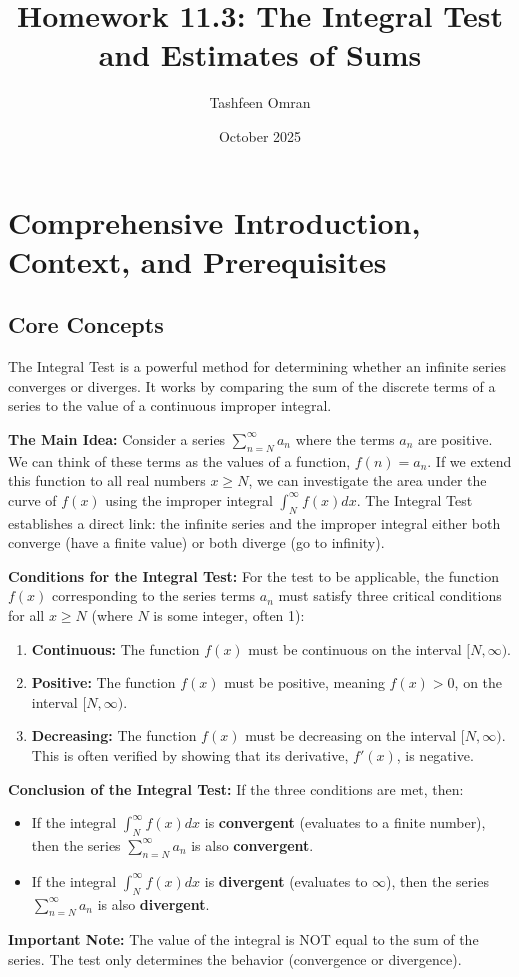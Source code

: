 \documentclass{article}
\title{Homework 11.3: The Integral Test and Estimates of Sums}
\author{Tashfeen Omran}
\date{October 2025}
\begin{document}
\maketitle

\section{Comprehensive Introduction, Context, and Prerequisites}

\subsection{Core Concepts}
The Integral Test is a powerful method for determining whether an infinite series converges or diverges. It works by comparing the sum of the discrete terms of a series to the value of a continuous improper integral.

\textbf{The Main Idea:} Consider a series $\sum_{n=N}^{\infty} a_n$ where the terms $a_n$ are positive. We can think of these terms as the values of a function, $f(n) = a_n$. If we extend this function to all real numbers $x \ge N$, we can investigate the area under the curve of $f(x)$ using the improper integral $\int_N^\infty f(x) dx$. The Integral Test establishes a direct link: the infinite series and the improper integral either both converge (have a finite value) or both diverge (go to infinity).

\textbf{Conditions for the Integral Test:}
For the test to be applicable, the function $f(x)$ corresponding to the series terms $a_n$ must satisfy three critical conditions for all $x \ge N$ (where $N$ is some integer, often 1):
\begin{enumerate}
    \item \textbf{Continuous:} The function $f(x)$ must be continuous on the interval $[N, \infty)$.
    \item \textbf{Positive:} The function $f(x)$ must be positive, meaning $f(x) > 0$, on the interval $[N, \infty)$.
    \item \textbf{Decreasing:} The function $f(x)$ must be decreasing on the interval $[N, \infty)$. This is often verified by showing that its derivative, $f'(x)$, is negative.
\end{enumerate}

\textbf{Conclusion of the Integral Test:}
If the three conditions are met, then:
\begin{itemize}
    \item If the integral $\int_N^\infty f(x) dx$ is \textbf{convergent} (evaluates to a finite number), then the series $\sum_{n=N}^{\infty} a_n$ is also \textbf{convergent}.
    \item If the integral $\int_N^\infty f(x) dx$ is \textbf{divergent} (evaluates to $\infty$), then the series $\sum_{n=N}^{\infty} a_n$ is also \textbf{divergent}.
\end{itemize}
\textbf{Important Note:} The value of the integral is NOT equal to the sum of the series. The test only determines the behavior (convergence or divergence).
\end{document}
